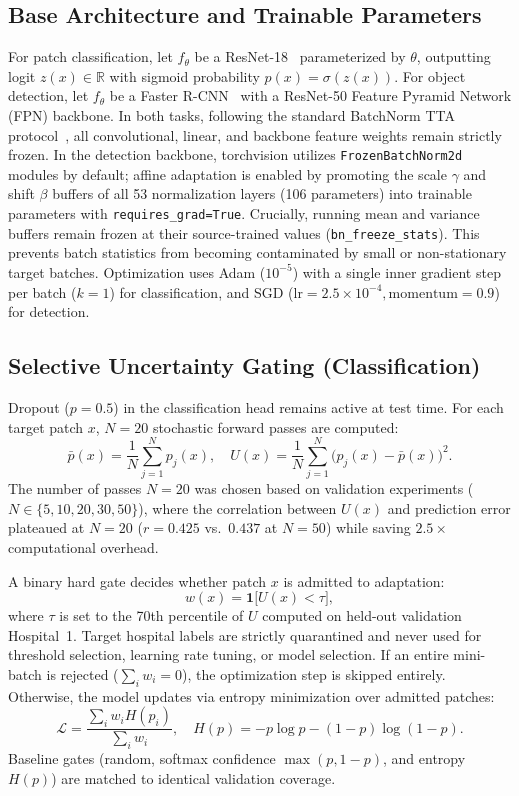 \documentclass[conference]{IEEEtran}
\begin{document}
\subsection{Base Architecture and Trainable Parameters}
For patch classification, let $f_\theta$ be a ResNet-18~\cite{he2016resnet} parameterized by $\theta$, outputting logit $z(x) \in \mathbb{R}$ with sigmoid probability $p(x) = \sigma(z(x))$.
For object detection, let $f_\theta$ be a Faster R-CNN~\cite{ren2015fasterrcnn} with a ResNet-50 Feature Pyramid Network (FPN) backbone.
In both tasks, following the standard BatchNorm TTA protocol~\cite{wang2021tent}, all convolutional, linear, and backbone feature weights remain strictly frozen.
In the detection backbone, torchvision utilizes \texttt{FrozenBatchNorm2d} modules by default; affine adaptation is enabled by promoting the scale $\gamma$ and shift $\beta$ buffers of all 53 normalization layers (106 parameters) into trainable parameters with \texttt{requires\_grad=True}.
Crucially, running mean and variance buffers remain frozen at their source-trained values (\texttt{bn\_freeze\_stats}).
This prevents batch statistics from becoming contaminated by small or non-stationary target batches.
Optimization uses Adam ($10^{-5}$) with a single inner gradient step per batch ($k=1$) for classification, and SGD ($\mathrm{lr}=2.5\times 10^{-4}, \text{momentum}=0.9$) for detection.

\subsection{Selective Uncertainty Gating (Classification)}
Dropout ($p=0.5$) in the classification head remains active at test time.
For each target patch $x$, $N=20$ stochastic forward passes are computed:
\begin{equation}
\bar{p}(x) = \frac{1}{N} \sum_{j=1}^N p_j(x), \quad
U(x) = \frac{1}{N} \sum_{j=1}^N \bigl(p_j(x) - \bar{p}(x)\bigr)^2.
\end{equation}
The number of passes $N=20$ was chosen based on validation experiments ($N \in \{5, 10, 20, 30, 50\}$), where the correlation between $U(x)$ and prediction error plateaued at $N=20$ ($r=0.425$ vs.\ $0.437$ at $N=50$) while saving $2.5\times$ computational overhead.

A binary hard gate decides whether patch $x$ is admitted to adaptation:
\begin{equation}
w(x) = \mathbf{1}\bigl[U(x) < \tau\bigr],
\end{equation}
where $\tau$ is set to the 70th percentile of $U$ computed on held-out validation Hospital~1.
Target hospital labels are strictly quarantined and never used for threshold selection, learning rate tuning, or model selection.
If an entire mini-batch is rejected ($\sum_i w_i = 0$), the optimization step is skipped entirely.
Otherwise, the model updates via entropy minimization over admitted patches:
\begin{equation}
\mathcal{L} = \frac{\sum_i w_i H(p_i)}{\sum_i w_i}, \quad
H(p) = -p \log p - (1-p) \log (1-p).
\end{equation}
Baseline gates (random, softmax confidence $\max(p, 1-p)$, and entropy $H(p)$) are matched to identical validation coverage.
\end{document}
